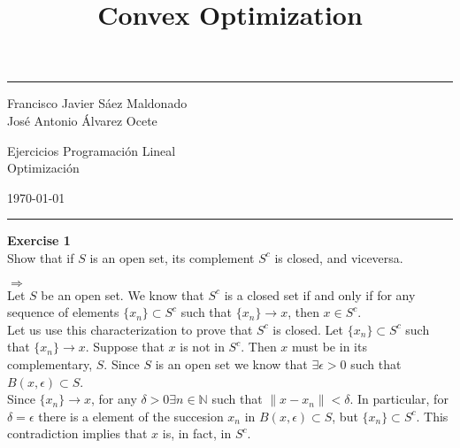 \documentclass[11pt,table]{article}
\title{Convex Optimization}
\newenvironment{problem}[2][Exercise]
{ \begin{mdframed}[backgroundcolor=gray!20] \textbf{#1 #2} \\}
	{  \end{mdframed}}
\begin{document}
	
	
	\fancyhead[C]{}
	\hrule \medskip %
	\begin{minipage}{0.295\textwidth}
		\raggedright
		\footnotesize
		Francisco Javier Sáez Maldonado \hfill\\
		José Antonio Álvarez Ocete \hfill\\
	\end{minipage}
	\begin{minipage}{0.4\textwidth}
		\centering
		\large
		Ejercicios Programación Lineal\\
		\normalsize
		Optimización\\
	\end{minipage}
	\begin{minipage}{0.295\textwidth}
		\raggedleft
		\today\hfill\\
	\end{minipage}
	\medskip\hrule
	\bigskip
	
	
	\begin{problem}{1}
		Show that if \( S \) is an open set, its complement \( S^c \) is closed, and viceversa.
	\end{problem}
	
	\(\boxed{\Rightarrow}\)\\
	
	Let \(S\) be an open set. We know that \(S^c\) is a closed set if and only if for any sequence of elements \(\{x_n\} \subset S^c\) such that \(\{x_n\} \longrightarrow x\), then \(x \in S^c\). \\
	
	Let us use this characterization to prove that \(S^c\) is closed. Let \(\{x_n\} \subset S^c\) such that \(\{x_n\} \longrightarrow x\). Suppose that \(x\) is not in \(S^c\). Then \(x\) must be in its complementary, \(S\). Since \(S\) is an open set we know that \(\exists \epsilon > 0\) such that \( B(x, \epsilon) \subset S\). \\
	
	Since \(\{x_n\} \longrightarrow x\), for any \(\delta > 0 \exists n \in \mathbb{N}\) such that \( \parallel x - x_n \parallel < \delta\). In particular, for \(\delta = \epsilon\) there is a element of the succesion \(x_n\) in \( B(x, \epsilon) \subset S\), but \(\{x_n\} \subset S^c\). This contradiction implies that \(x\) is, in fact, in \(S^c\).
	
\end{document}
